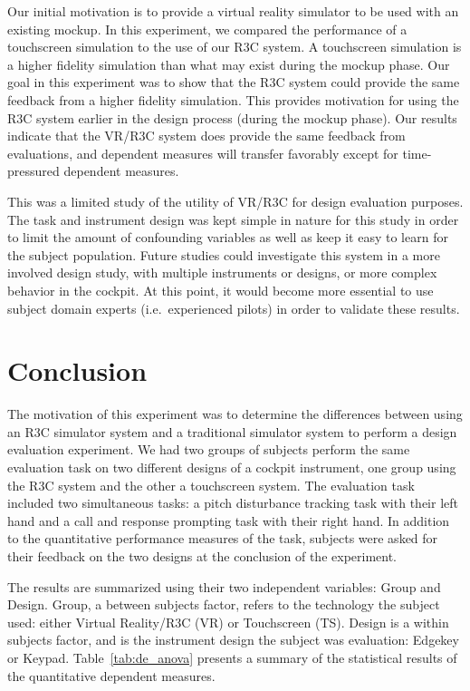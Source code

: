 Our initial motivation is to provide a virtual reality simulator to be used with an existing mockup.
In this experiment, we compared the performance of a touchscreen simulation to the use of our R3C system.
A touchscreen simulation is a higher fidelity simulation than what may exist during the mockup phase.
Our goal in this experiment was to show that the R3C system could provide the same feedback from a higher fidelity simulation.
This provides motivation for using the R3C system earlier in the design process (during the mockup phase).
Our results indicate that the VR/R3C system does provide the same feedback from evaluations, and dependent measures will transfer favorably except for time-pressured dependent measures.

This was a limited study of the utility of VR/R3C for design evaluation purposes.
The task and instrument design was kept simple in nature for this study in order to limit the amount of confounding variables as well as keep it easy to learn for the subject population.
Future studies could investigate this system in a more involved design study, with multiple instruments or designs, or more complex behavior in the cockpit.
At this point, it would become more essential to use subject domain experts (i.e.\ experienced pilots) in order to validate these results.

\section{Conclusion}

The motivation of this experiment was to determine the differences between using an R3C simulator system and a traditional simulator system to perform a design evaluation experiment.
We had two groups of subjects perform the same evaluation task on two different designs of a cockpit instrument, one group using the R3C system and the other a touchscreen system.
The evaluation task included two simultaneous tasks: a pitch disturbance tracking task with their left hand and a call and response prompting task with their right hand.
In addition to the quantitative performance measures of the task, subjects were asked for their feedback on the two designs at the conclusion of the experiment.

The results are summarized using their two independent variables: Group and Design.
Group, a between subjects factor, refers to the technology the subject used: either Virtual Reality/R3C (VR) or Touchscreen (TS).
Design is a within subjects factor, and is the instrument design the subject was evaluation: Edgekey or Keypad.
Table~\ref{tab:de_anova} presents a summary of the statistical results of the quantitative dependent measures.

